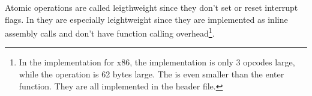 Atomic operations are called leigthweight since they don't set or reset
interrupt flags. In \oswald they are especially leightweight since they are
implemented as inline assembly calls and don't have function calling
overhead\footnote{In the \oswald implementation for x86, the
 implementation is only 3 opcodes large, while the
 operation is 62 bytes large. The
 is even smaller than the enter function. They are
all implemented in the  header file.}.















